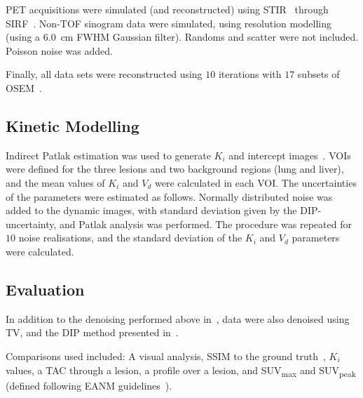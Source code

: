             \gls{PET} acquisitions were simulated (and reconstructed) using \gls{STIR}~\parencite{Thielemans2012} through \gls{SIRF}~\parencite{Ovtchinnikov2017}. \gls{Non-TOF} sinogram data were simulated, using resolution modelling (using a \SI{6.0}{\centi\meter} \gls{FWHM} Gaussian filter). Randoms and scatter were not included. Poisson noise was added.%
    
            Finally, all data sets were reconstructed using $10$ iterations with $17$ subsets of \gls{OSEM}~\parencite{Hudson1994}.
        
        \subsection{Kinetic Modelling} \label{sec:pseudo_bayesian_dip_denoising_as_a_preprocessing_step_for_kinetic_modelling_in_dynamic_pet_appendix_methods_kinetic_modelling}
            Indirect Patlak estimation was used to generate $K_i$ and intercept images~\parencite{Patlak1983GraphicalData}. \glspl{VOI} were defined for the three lesions and two background regions (lung and liver), and the mean values of $K_i$ and $V_d$ were calculated in each \gls{VOI}. The uncertainties of the parameters were estimated as follows. Normally distributed noise was added to the dynamic images, with standard deviation given by the \gls{DIP}-uncertainty, and Patlak analysis was performed. The procedure was repeated for $10$ noise realisations, and the standard deviation of the $K_i$ and $V_d$ parameters were calculated.
        
        \subsection{Evaluation} \label{sec:pseudo_bayesian_dip_denoising_as_a_preprocessing_step_for_kinetic_modelling_in_dynamic_pet_appendix_methods_evaluation}
            In addition to the denoising performed above in~, data were also denoised using \gls{TV}, and the \gls{DIP} method presented in~\parencite{Gong2019PETPrior}.
            
            Comparisons used included: A visual analysis, \gls{SSIM} to the ground truth~\parencite{Wang2009MeanMeasures}, $K_i$ values, a \gls{TAC} through a lesion, a profile over a lesion, and \gls{SUV}\textsubscript{max} and \gls{SUV}\textsubscript{peak} (defined following \gls{EANM} guidelines~\parencite{Boellaard2015FDG2.0}).
    
